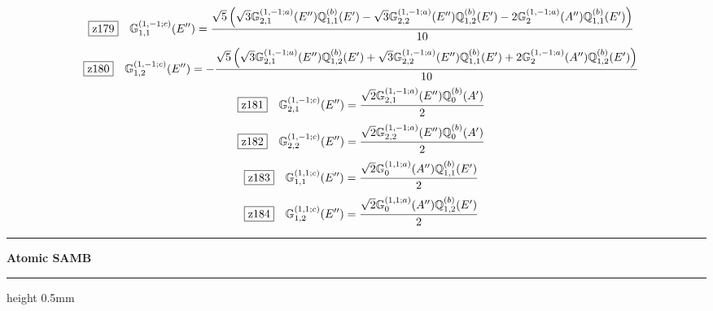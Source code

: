 \documentclass[fleqn,10pt,landscape]{jsarticle}
\begin{document}
\begin{dmath*}
\hspace*{3mm}\fbox{z179}\quad \mathbb{G}_{1,1}^{(1,-1;c)}(E^{\prime\prime})=\frac{\sqrt{5} \left(\sqrt{3} \mathbb{G}_{2,1}^{(1,-1;a)}(E^{\prime\prime}) \mathbb{Q}_{1,1}^{(b)}(E^{\prime}) - \sqrt{3} \mathbb{G}_{2,2}^{(1,-1;a)}(E^{\prime\prime}) \mathbb{Q}_{1,2}^{(b)}(E^{\prime}) - 2 \mathbb{G}_{2}^{(1,-1;a)}(A^{\prime\prime}) \mathbb{Q}_{1,1}^{(b)}(E^{\prime})\right)}{10}
\end{dmath*}
\begin{dmath*}
\hspace*{3mm}\fbox{z180}\quad \mathbb{G}_{1,2}^{(1,-1;c)}(E^{\prime\prime})=- \frac{\sqrt{5} \left(\sqrt{3} \mathbb{G}_{2,1}^{(1,-1;a)}(E^{\prime\prime}) \mathbb{Q}_{1,2}^{(b)}(E^{\prime}) + \sqrt{3} \mathbb{G}_{2,2}^{(1,-1;a)}(E^{\prime\prime}) \mathbb{Q}_{1,1}^{(b)}(E^{\prime}) + 2 \mathbb{G}_{2}^{(1,-1;a)}(A^{\prime\prime}) \mathbb{Q}_{1,2}^{(b)}(E^{\prime})\right)}{10}
\end{dmath*}
\begin{dmath*}
\hspace*{3mm}\fbox{z181}\quad \mathbb{G}_{2,1}^{(1,-1;c)}(E^{\prime\prime})=\frac{\sqrt{2} \mathbb{G}_{2,1}^{(1,-1;a)}(E^{\prime\prime}) \mathbb{Q}_{0}^{(b)}(A^{\prime})}{2}
\end{dmath*}
\begin{dmath*}
\hspace*{3mm}\fbox{z182}\quad \mathbb{G}_{2,2}^{(1,-1;c)}(E^{\prime\prime})=\frac{\sqrt{2} \mathbb{G}_{2,2}^{(1,-1;a)}(E^{\prime\prime}) \mathbb{Q}_{0}^{(b)}(A^{\prime})}{2}
\end{dmath*}
\begin{dmath*}
\hspace*{3mm}\fbox{z183}\quad \mathbb{G}_{1,1}^{(1,1;c)}(E^{\prime\prime})=\frac{\sqrt{2} \mathbb{G}_{0}^{(1,1;a)}(A^{\prime\prime}) \mathbb{Q}_{1,1}^{(b)}(E^{\prime})}{2}
\end{dmath*}
\begin{dmath*}
\hspace*{3mm}\fbox{z184}\quad \mathbb{G}_{1,2}^{(1,1;c)}(E^{\prime\prime})=\frac{\sqrt{2} \mathbb{G}_{0}^{(1,1;a)}(A^{\prime\prime}) \mathbb{Q}_{1,2}^{(b)}(E^{\prime})}{2}
\end{dmath*}
\vspace{5mm}

\vspace{5mm}
\noindent \rule[0.5mm]{5mm}{0.5mm}\hspace{3mm}\textbf{Atomic SAMB}\hspace{3mm}\leaders\hrule height 0.5mm\hfill\kern0pt
\vspace{3mm}
\end{document}
